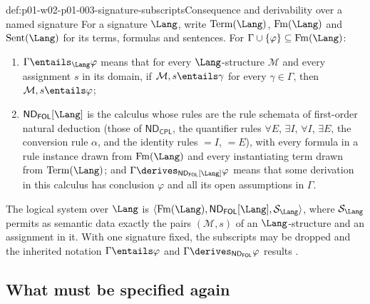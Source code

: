 \begin{hbconvention}{def:p01-w02-p01-003-signature-subscripts}{Consequence and derivability over a named signature}
For a signature \(\Lang\), write
\(\operatorname{Term}(\Lang)\), \(\operatorname{Fm}(\Lang)\) and
\(\operatorname{Sent}(\Lang)\) for its terms, formulas and sentences.
For \(\Gamma\cup\{\varphi\}\subseteq\operatorname{Fm}(\Lang)\):
\begin{enumerate}
  \item \(\Gamma\entails_{\Lang}\varphi\) means that for every
        \(\Lang\)-structure \(\mathcal M\) and every assignment \(s\) in its
        domain, if \(\mathcal M,s\entails\gamma\) for every
        \(\gamma\in\Gamma\), then \(\mathcal M,s\entails\varphi\);
  \item \(\mathsf{ND}_{\mathsf{FOL}}[\Lang]\) is the calculus whose rules are
        the rule schemata of first-order natural deduction (those of
        \(\mathsf{ND}_{\mathsf{CPL}}\), the quantifier rules
        \(\forall E\), \(\exists I\), \(\forall I\), \(\exists E\), the
        conversion rule \(\alpha\), and the identity rules \(=I\), \(=E\)),
        with every formula in a rule instance drawn from
        \(\operatorname{Fm}(\Lang)\) and every instantiating term drawn from
        \(\operatorname{Term}(\Lang)\); and
        \(\Gamma\derives_{\mathsf{ND}_{\mathsf{FOL}}[\Lang]}\varphi\) means
        that some derivation in this calculus has conclusion \(\varphi\) and
        all its open assumptions in \(\Gamma\).
\end{enumerate}
The logical system over \(\Lang\) is
\(\langle\operatorname{Fm}(\Lang),\mathsf{ND}_{\mathsf{FOL}}[\Lang],
\mathcal S_{\Lang}\rangle\), where \(\mathcal S_{\Lang}\) permits as semantic
data exactly the pairs \((\mathcal M,s)\) of an \(\Lang\)-structure and an
assignment in it. With one signature fixed, the subscripts may be dropped
and the inherited notation \(\Gamma\entails\varphi\) and
\(\Gamma\derives_{\mathsf{ND}_{\mathsf{FOL}}}\varphi\) results
\cite[ch.~``Structures, Satisfaction, and Translation'', definition
``Truth, validity, and semantic consequence''; ch.~``First-Order
Deduction'', definition ``First-order derivability'']{FrozenFormalLogicLanguageChange}.
\end{hbconvention}

\subsection{What must be specified again}
\label{sec:p01-w02-p01-003-respecify}

